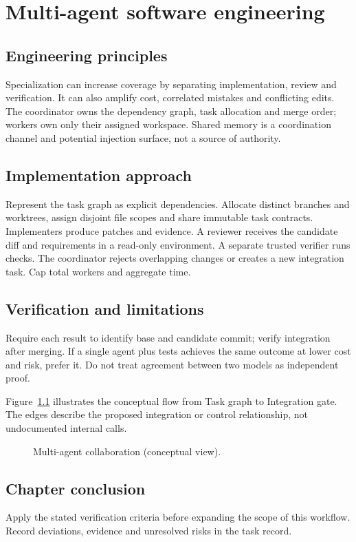 \chapter{Multi-agent software engineering}

\section{Engineering principles}

Specialization can increase coverage by separating implementation, review and verification. It can also amplify cost, correlated mistakes and conflicting edits. The coordinator owns the dependency graph, task allocation and merge order; workers own only their assigned workspace. Shared memory is a coordination channel and potential injection surface, not a source of authority.

\section{Implementation approach}

Represent the task graph as explicit dependencies. Allocate distinct branches and worktrees, assign disjoint file scopes and share immutable task contracts. Implementers produce patches and evidence. A reviewer receives the candidate diff and requirements in a read-only environment. A separate trusted verifier runs checks. The coordinator rejects overlapping changes or creates a new integration task. Cap total workers and aggregate time.

\section{Verification and limitations}

Require each result to identify base and candidate commit; verify integration after merging. If a single agent plus tests achieves the same outcome at lower cost and risk, prefer it. Do not treat agreement between two models as independent proof.

Figure~\ref{fig:d15} illustrates the conceptual flow from Task graph to Integration gate. The edges describe the proposed integration or control relationship, not undocumented internal calls.

\begin{figure}[htbp]\centering\caption{Multi-agent collaboration (conceptual view).}\label{fig:d15}\end{figure}

\section{Chapter conclusion}

Apply the stated verification criteria before expanding the scope of this workflow. Record deviations, evidence and unresolved risks in the task record.
